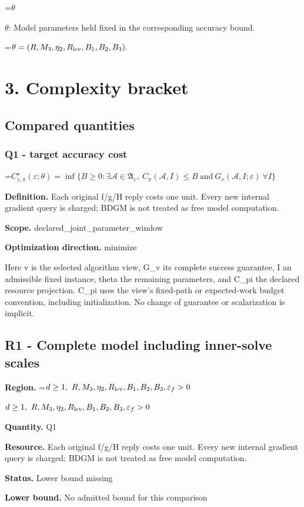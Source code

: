 \documentclass[10pt,a4paper]{article}
\newcommand{\AtlasMath}[1]{\par\begingroup\centering\setbox0=\hbox{$\displaystyle #1$}\ifdim\wd0>1.4\linewidth\typeout{ATLAS WIDE FORMULA: \the\wd0}\fi\ifdim\wd0>\linewidth\resizebox{\linewidth}{!}{\box0}\else\box0\fi\par\endgroup}
\newcommand{\AtlasInlineMath}[1]{\begingroup\setbox0=\hbox{$#1$}\ifdim\wd0>.4\linewidth\endgroup\AtlasMath{#1}\else\endgroup$#1$\fi}
\begin{document}
\AtlasInlineMath{\theta}: Model parameters held fixed in the corresponding accuracy bound.


\AtlasMath{\theta=(R,M_3,\eta_2,R_{\rm lev},B_1,B_2,B_3).}


\section{3. Complexity bracket}
\subsection{Compared quantities}
\subsubsection{Q1 - target accuracy cost}
\AtlasMath{C^\star_{v,\pi}(\varepsilon;\theta)=\inf\{B\ge0:\exists\mathcal A\in\mathfrak A_v,\ C_\pi(\mathcal A,I)\le B\ \text{and}\ G_v(\mathcal A,I;\varepsilon)\ \forall I\}}
\textbf{Definition.} Each original f/g/H reply costs one unit. Every new internal gradient query is charged; BDGM is not treated as free model computation.

\textbf{Scope.} declared\_joint\_parameter\_window

\textbf{Optimization direction.} minimize

Here v is the selected algorithm view, G\_v its complete success guarantee, I an admissible fixed instance, theta the remaining parameters, and C\_pi the declared resource projection. C\_pi uses the view's fixed-path or expected-work budget convention, including initialization. No change of guarantee or scalarization is implicit.

\subsection{R1 - Complete model including inner-solve scales}
\textbf{Region.} \AtlasInlineMath{d\ge1,\ R,M_3,\eta_2,R_{\rm lev},B_1,B_2,B_3,\varepsilon_f>0}

\textbf{Quantity.} Q1

\textbf{Resource.} Each original f/g/H reply costs one unit. Every new internal gradient query is charged; BDGM is not treated as free model computation.

\textbf{Status.} Lower bound missing

\textbf{Lower bound.} No admitted bound for this comparison
\end{document}
